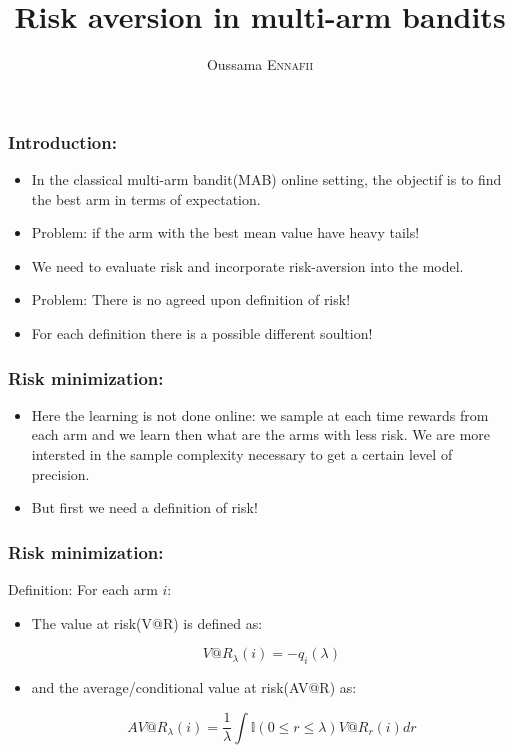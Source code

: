 \documentclass[english]{beamer}
\title{\textbf{Risk aversion in multi-arm bandits}}
\author{Oussama \textsc{Ennafii}}
\institute[ENS]{
\structure{
Ecole Normale Superieur de Cachan}
}
\begin{document}
\begin{frame}
\maketitle
\end{frame}

\begin{frame}
\frametitle{Introduction:}
\begin{itemize}
\item In the classical multi-arm bandit(MAB) online setting, the objectif is to find the best arm in terms of expectation.
\item Problem: if the arm with the best mean value have heavy tails!
\item We need to evaluate risk and incorporate risk-aversion into the model.
\item Problem: There is no agreed upon definition of risk!
\item For each definition there is a possible different soultion!
\end{itemize}

\end{frame}


\begin{frame}
\frametitle{Risk minimization:}
\begin{itemize}
\item Here the learning is not done online: we sample at each time rewards from each arm and we learn then  what are the arms with less risk. We are more intersted in the sample complexity necessary to get a certain level of precision.
\item But first we need a definition of risk!
\end{itemize}
\end{frame}

\begin{frame}
\frametitle{Risk minimization:}

\begin{block}{Definition:}
For each arm $i$:
\begin{itemize}
\item The value at risk(V@R) is defined as:

$$V@R_{\lambda}(i)= -q_i(\lambda)$$
\item and the average/conditional value at risk(AV@R) as:

$$AV@R_{\lambda}(i)= \frac{1}{\lambda}\int\mathbb{I}(0\leq r\leq \lambda)V@R_{r}(i)dr$$
\end{itemize}
\end{block}
\end{frame}
\end{document}
